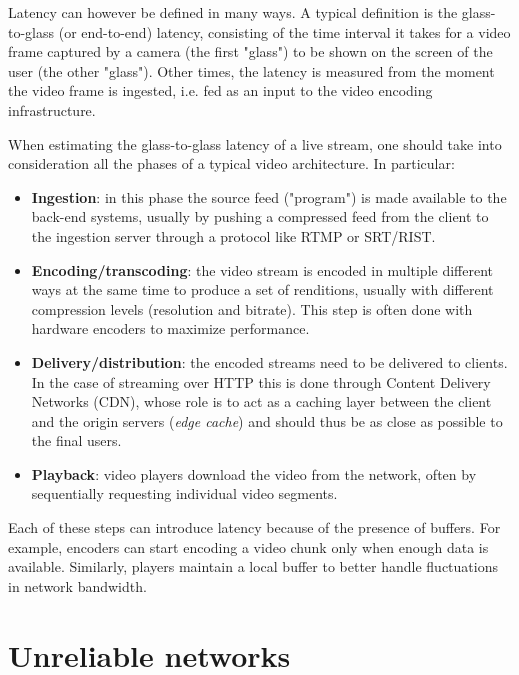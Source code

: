 Latency can however be defined in many ways. A typical definition is the glass-to-glass (or end-to-end) latency, consisting of the time interval it takes for a video frame captured by a camera (the first "glass") to be shown on the screen of the user (the other "glass"). Other times, the latency is measured from the moment the video frame is ingested, i.e. fed as an input to the video encoding infrastructure.


When estimating the glass-to-glass latency of a live stream, one should take into consideration all the phases of a typical video architecture. In particular:

\begin{itemize}
    \item \textbf{Ingestion}: in this phase the source feed ("program") is made available to the back-end systems, usually by pushing a compressed feed from the client to the ingestion server through a protocol like RTMP or SRT/RIST.
    \item \textbf{Encoding/transcoding}: the video stream is encoded in multiple different ways at the same time to produce a set of renditions, usually with different compression levels (resolution and bitrate). This step is often done with hardware encoders to maximize performance.
    \item \textbf{Delivery/distribution}: the encoded streams need to be delivered to clients. In the case of streaming over HTTP this is done through Content Delivery Networks (CDN), whose role is to act as a caching layer between the client and the origin servers (\textit{edge cache}) and should thus be as close as possible to the final users.
    \item \textbf{Playback}: video players download the video from the network, often by sequentially requesting individual video segments.
\end{itemize}


Each of these steps can introduce latency because of the presence of buffers. For example, encoders can start encoding a video chunk only when enough data is available. Similarly, players maintain a local buffer to better handle fluctuations in network bandwidth.

\section{Unreliable networks}
\label{sec:intro/networks}

